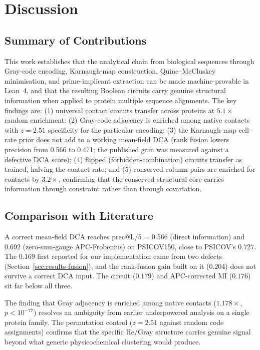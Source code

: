 \section{Discussion}
\label{sec:discussion}

\subsection{Summary of Contributions}
This work establishes that the analytical chain from biological sequences
through Gray-code encoding, Karnaugh-map construction, Quine--McCluskey
minimisation, and prime-implicant extraction can be made machine-provable in
Lean~4, and that the resulting Boolean circuits carry genuine structural
information when applied to protein multiple sequence alignments.  The key
findings are: (1) universal contact circuits transfer across proteins at
$5.1\times$ random enrichment; (2) Gray-code adjacency is enriched among
native contacts with $z = 2.51$ specificity for the particular encoding;
(3) the Karnaugh-map cell-rate prior does not add to a working mean-field
DCA (rank fusion lowers precision from 0.566 to 0.471; the published gain was
measured against a defective DCA score); (4) flipped (forbidden-combination)
circuits transfer as trained, halving the contact rate; and (5)
conserved column pairs are enriched for contacts by $3.2\times$, confirming
that the conserved structural core carries information through constraint
rather than through covariation.

\subsection{Comparison with Literature}
A correct mean-field DCA reaches prec@L/5 = 0.566 (direct information) and
0.692 (zero-sum-gauge APC-Frobenius) on PSICOV150, close to PSICOV's 0.727.
The 0.169 first reported for our implementation came from two defects
(Section~\ref{sec:results-fusion}), and the rank-fusion gain built on it
(0.204) does not survive a correct DCA input.  The circuit ($0.179$) and
APC-corrected MI ($0.176$) sit far below all three.

The finding that Gray adjacency is enriched among native contacts ($1.178\times$,
$p < 10^{-77}$) resolves an ambiguity from earlier underpowered analysis on a
single protein family.  The permutation control ($z = 2.51$ against random
code assignments) confirms that the specific He/Gray structure carries genuine
signal beyond what generic physicochemical clustering would produce.

